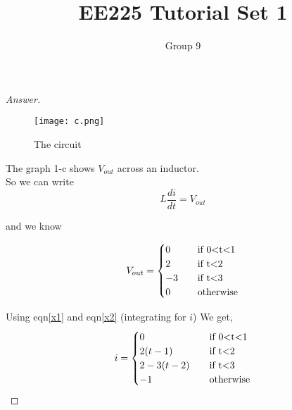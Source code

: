 \documentclass[12pt]{article}
\newenvironment{problem}[2][Problem]{\begin{trivlist}
\item[\hskip \labelsep {\bfseries #1}\hskip \labelsep {\bfseries #2.}]}{\end{trivlist}}
\begin{document}
 
 
\title{EE225 Tutorial Set 1}
\author{Group 9}
\maketitle
 
\begin{problem}{1.2.c}
\end{problem}
 
\begin{proof}[Answer]

\begin{figure}[H]
\centering
{\texttt{[image: c.png]}}\\
 \caption{The circuit}
 \label{ann2}
\end{figure}

The graph 1-c shows $V_{out}$ across an inductor.\\
So we can write
\begin{equation}
   L\frac{di}{dt} = V_{out} 
   \label{x1}
\end{equation}

 and we know 

\begin{equation}
V_{out} = \begin{cases}
        0 &\quad\text{if 0\textless t\textless1}\\
        2 &\quad\text{if t\textless2}\\
        -3 &\quad\text{if t\textless3}\\
        0 &\quad\text{otherwise}\\
            \end{cases}
    \label{x2}
\end{equation}

Using eqn\ref{x1} and eqn\ref{x2} (integrating for $i$)
We get,
\begin{equation}
i = \begin{cases}
        0 &\quad\text{if 0\textless t\textless1}\\
        2(t-1) &\quad\text{if t\textless2}\\
        2-3(t-2) &\quad\text{if t\textless3}\\
        -1 &\quad\text{otherwise}\\
            \end{cases}
    \label{x3}
\end{equation}


\end{proof}
\end{document}
